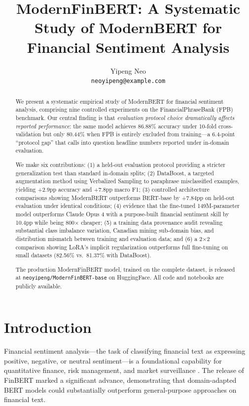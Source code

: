 \documentclass[11pt]{article}
\title{ModernFinBERT: A Systematic Study of ModernBERT for Financial Sentiment Analysis}
\author{
    Yipeng Neo \\
    \texttt{neoyipeng@example.com}
}
\date{}
\begin{document}
\maketitle

\begin{abstract}
We present a systematic empirical study of ModernBERT for financial sentiment analysis, comprising nine controlled experiments on the FinancialPhraseBank (FPB) benchmark. Our central finding is that \emph{evaluation protocol choice dramatically affects reported performance}: the same model achieves 86.88\% accuracy under 10-fold cross-validation but only 80.44\% when FPB is entirely excluded from training---a 6.4-point ``protocol gap'' that calls into question headline numbers reported under in-domain evaluation.

We make six contributions: (1) a held-out evaluation protocol providing a stricter generalization test than standard in-domain splits; (2) DataBoost, a targeted augmentation method using Verbalized Sampling to paraphrase misclassified examples, yielding +2.9pp accuracy and +7.8pp macro F1; (3) controlled architecture comparisons showing ModernBERT outperforms BERT-base by +7.84pp on held-out evaluation under identical conditions; (4) evidence that the fine-tuned 149M-parameter model outperforms Claude Opus 4 with a purpose-built financial sentiment skill by 10.4pp while being 800$\times$ cheaper; (5) a training data provenance audit revealing substantial class imbalance variation, Canadian mining sub-domain bias, and distribution mismatch between training and evaluation data; and (6) a 2$\times$2 comparison showing LoRA's implicit regularization outperforms full fine-tuning on small datasets (82.56\% vs.\ 81.37\% with DataBoost).

The production ModernFinBERT model, trained on the complete dataset, is released at \texttt{neoyipeng/ModernFinBERT-base} on HuggingFace. All code and notebooks are publicly available.
\end{abstract}

\section{Introduction}
\label{sec:intro}

Financial sentiment analysis---the task of classifying financial text as expressing positive, negative, or neutral sentiment---is a foundational capability for quantitative finance, risk management, and market surveillance \citep{loughran2011liability, malo2014good}. The release of FinBERT \citep{araci2019finbert, yang2020finbert} marked a significant advance, demonstrating that domain-adapted BERT models could substantially outperform general-purpose approaches on financial text.
\end{document}
